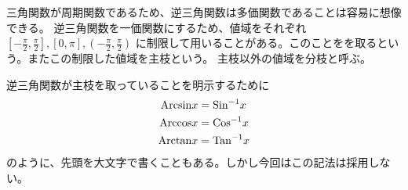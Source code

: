 \documentclass[a4j,dvipdfmx]{jsarticle}
\begin{document}
                三角関数が周期関数であるため、逆三角関数は多価関数であることは容易に想像できる。
                逆三角関数を一価関数にするため、値域をそれぞれ$[-\frac{\pi}{2},\frac{\pi}{2}],[0,\pi],(-\frac{\pi}{2},\frac{\pi}{2})$
                に制限して用いることがある。このことをを取るという。またこの制限した値域を主枝という。
                主枝以外の値域を分枝と呼ぶ。

                逆三角関数が主枝を取っていることを明示するために
                \begin{align}
                    {\rm Arcsin} x &= {\rm Sin^{-1}} x \\
                    {\rm Arccos} x &= {\rm Cos^{-1}} x \\
                    {\rm Arctan} x &= {\rm Tan^{-1}} x
                \end{align}
                のように、先頭を大文字で書くこともある。しかし今回はこの記法は採用しない。
\end{document}
